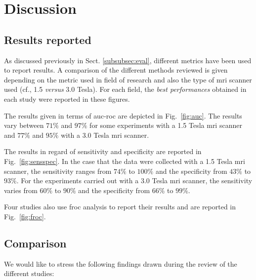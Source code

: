 \section{Discussion} \label{sec:discussion}

\subsection{Results reported}

As discussed previously in Sect. \ref{subsubsec:eval}, different metrics have been used to report results. A comparison of the different methods reviewed is given depending on the metric used in field of research and also the type of \ac{mri} scanner used (cf., 1.5 \textit{versus} 3.0 Tesla). For each field, the \textit{best performances} obtained in each study were reported in these figures.

The results given in terms of \ac{auc}-\ac{roc} are depicted in Fig.~\ref{fig:auc}. The results vary between $71\%$ and $97\%$ for some experiments with a 1.5 Tesla \ac{mri} scanner and $77\%$ and $95\%$ with a 3.0 Tesla \ac{mri} scanner. 

The results in regard of sensitivity and specificity are reported in Fig.~\ref{fig:sensspec}. In the case that the data were collected with a 1.5 Tesla \ac{mri} scanner, the sensitivity ranges from $74\%$ to $100\%$ and the specificity from $43\%$ to $93\%$. For the experiments carried out with a 3.0 Tesla \ac{mri} scanner, the sensitivity varies from $60\%$ to $90\%$ and the specificity from $66\%$ to $99\%$.

Four studies also use \ac{froc} analysis to report their results and are reported in Fig.~\ref{fig:froc}.


\subsection{Comparison}

We would like to stress the following findings drawn during the review of the different studies:

